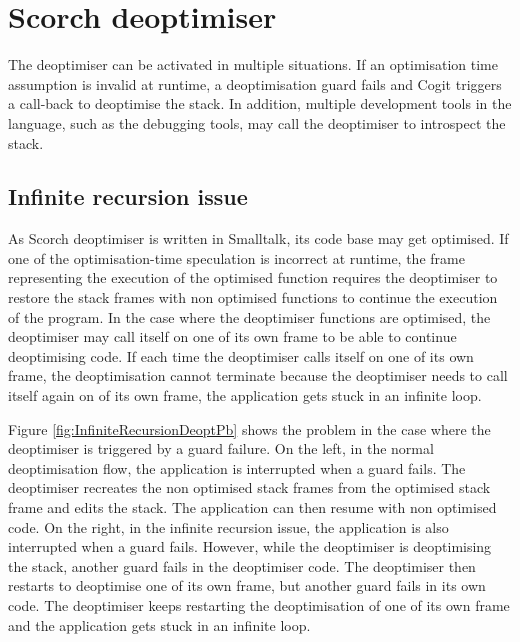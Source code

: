 \documentclass[a4paper,12pt,twoside]{../includes/ThesisStyle}
\begin{document}



\section{Scorch deoptimiser}

The deoptimiser can be activated in multiple situations. If an optimisation time assumption is invalid at runtime, a deoptimisation guard fails and Cogit triggers a call-back to deoptimise the stack. In addition, multiple development tools in the language, such as the debugging tools, may call the deoptimiser to introspect the stack.

\subsection{Infinite recursion issue}

As Scorch deoptimiser is written in Smalltalk, its code base may get optimised. If one of the optimisation-time speculation is incorrect at runtime, the frame representing the execution of the optimised function requires the deoptimiser to restore the stack frames with non optimised functions to continue the execution of the program. In the case where the deoptimiser functions are optimised, the deoptimiser may call itself on one of its own frame to be able to continue deoptimising code. If each time the deoptimiser calls itself on one of its own frame, the deoptimisation cannot terminate because the deoptimiser needs to call itself again on of its own frame, the application gets stuck in an infinite loop.

Figure \ref{fig:InfiniteRecursionDeoptPb} shows the problem in the case where the deoptimiser is triggered by a guard failure. On the left, in the normal deoptimisation flow, the application is interrupted when a guard fails. The deoptimiser recreates the non optimised stack frames from the optimised stack frame and edits the stack. The application can then resume with non optimised code. On the right, in the infinite recursion issue, the application is also interrupted when a guard fails. However, while the deoptimiser is deoptimising the stack, another guard fails in the deoptimiser code. The deoptimiser then restarts to deoptimise one of its own frame, but another guard fails in its own code. The deoptimiser keeps restarting the deoptimisation of one of its own frame and the application gets stuck in an infinite loop.
\end{document}
